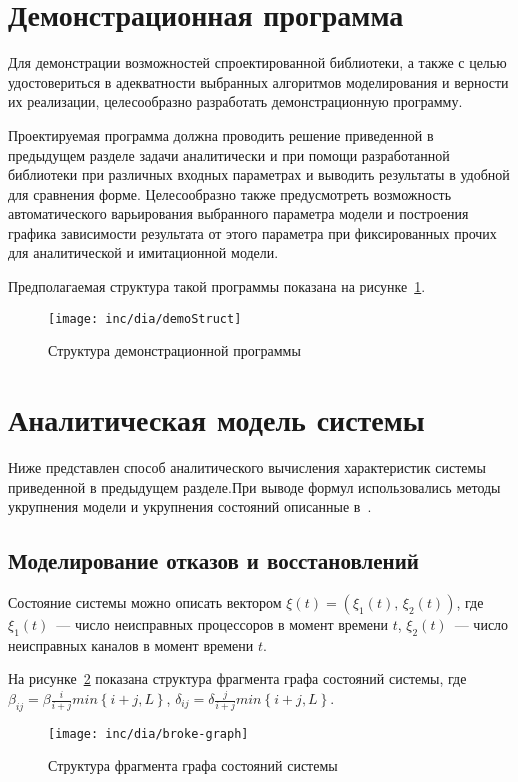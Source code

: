 \section{Демонстрационная программа}

Для демонстрации возможностей спроектированной библиотеки, а также с целью удостовериться  в адекватности выбранных алгоритмов моделирования и верности их реализации, целесообразно разработать демонстрационную программу. 

Проектируемая программа должна проводить решение приведенной в предыдущем разделе задачи аналитически и при помощи разработанной библиотеки при различных входных параметрах и выводить результаты в удобной для сравнения форме. Целесообразно также предусмотреть возможность автоматического варьирования выбранного параметра модели и построения графика зависимости результата от этого параметра при фиксированных прочих для аналитической и имитационной модели.

Предполагаемая структура такой программы показана на рисунке~\ref{fig:demoStruct}.

\begin{figure}[ht]
  \centering
  \texttt{[image: inc/dia/demoStruct]}
  \caption{Структура демонстрационной программы}
  \label{fig:demoStruct}
\end{figure}

\section{Аналитическая модель системы}

Ниже представлен способ аналитического вычисления характеристик системы приведенной в предыдущем разделе.При выводе формул использовались методы укрупнения модели и укрупнения состояний описанные в~\cite{Kurov}.

\subsection{Моделирование отказов и восстановлений}
Состояние системы можно описать вектором $ \xi (t) = (\xi_{1}(t),\,\xi_{2}(t))$, где $\xi_{1}(t)$~--- число неисправных процессоров в момент времени $t$, $\xi_{2}(t)$~--- число неисправных каналов в момент времени $t$.

На рисунке~\ref{fig:broke-graph} показана структура фрагмента графа состояний системы, где $\beta_{ij}=\beta\frac{i}{i+j}min\left\lbrace i+j,L\right\rbrace$, $\delta_{ij}=\delta\frac{j}{i+j}min\left\lbrace i+j,L\right\rbrace$. 
\begin{figure}[ht]
\centering
\texttt{[image: inc/dia/broke-graph]}
\caption{Структура фрагмента графа состояний системы}
\label{fig:broke-graph}
\end{figure}


